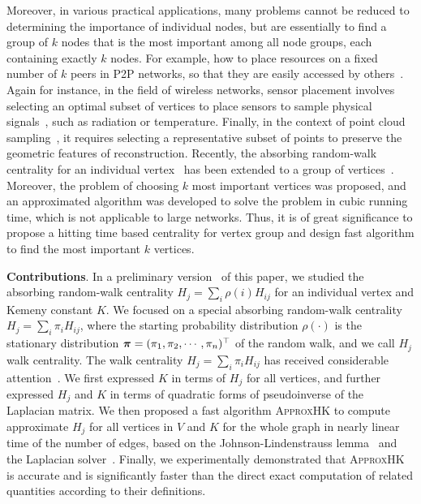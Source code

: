 \documentclass[10pt,twocolumn,twoside]{IEEEtran}
\begin{document}
Moreover, in various practical applications, many problems cannot be reduced to determining the importance of individual nodes, but are essentially to find a group of $k$ nodes that is the most important among all node groups, each containing exactly $k$ nodes. For example, how to place resources on a fixed number of $k$ peers in P2P networks, so that they are easily accessed by others~\cite{GkMiSa06}.  Again for instance, in the field of wireless networks, sensor placement involves selecting an optimal subset of vertices to place sensors to sample physical signals~\cite{KrSiGu08,RaChVe14}, such as radiation or temperature. Finally, in the context of point cloud sampling~\cite{DiChWaBa20,ChTiFeVeKo17}, it requires selecting a representative subset of points to preserve the geometric features of reconstruction. Recently, the absorbing random-walk centrality for an individual vertex~\cite{WhSm03} has been extended to a group of vertices~\cite{MaMaGi15}. Moreover, the problem of choosing \(k\) most important vertices was proposed, and an approximated algorithm was developed to solve the problem in cubic running time, which is not applicable to large networks. Thus, it is of great significance to propose a hitting time based centrality for vertex group and design fast algorithm to find the most important  $k$ vertices.


\textbf{ Contributions}. In a preliminary version~\cite{ZhXuZh20} of this paper, we studied the absorbing random-walk centrality $H_j=\sum_{i} \rho(i) H_{ij}$ for an individual vertex and Kemeny constant $K$. We focused on a special absorbing random-walk centrality $H_j=\sum_{i} \pi_i H_{ij}$, where the starting probability distribution $\rho(\cdot)$ is the stationary distribution $\boldsymbol{\pi}=(\pi_1, \pi_2, \cdots, \pi_n)^{\top}$ of the random walk, and we call $H_j$ walk centrality. The walk centrality $H_j=\sum_{i} \pi_i H_{ij}$ has received considerable attention~\cite{TeBeVo09,Be09,Be16}. We first expressed \(K\) in terms of \(H_j\) for all vertices, and further expressed \(H_j\) and \(K\) in terms of quadratic forms of pseudoinverse of the Laplacian matrix. We then proposed a fast algorithm \textsc{ApproxHK} to compute approximate \(H_j\) for all vertices in $V$ and \(K\) for the whole graph in nearly linear time of the number of edges, based on the Johnson-Lindenstrauss lemma~\cite{Ac01} and the Laplacian solver~\cite{SpTe04,Sp10,KoMiPe11,LiBr12,CoKyMiPaPeRaSu14,KySa16,GaKySp23}. Finally, we experimentally demonstrated that \textsc{ApproxHK} is accurate and is significantly faster than the direct exact computation of related quantities according to their definitions.
\end{document}
